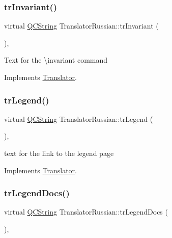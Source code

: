 \subsubsection{\texorpdfstring{trInvariant()}{trInvariant()}}
{\footnotesize\ttfamily virtual \mbox{\hyperlink{class_q_c_string}{Q\+C\+String}} Translator\+Russian\+::tr\+Invariant (\begin{DoxyParamCaption}{ }\end{DoxyParamCaption})\hspace{0.3cm}{\ttfamily [inline]}, {\ttfamily [virtual]}}

Text for the \textbackslash{}invariant command 

Implements \mbox{\hyperlink{class_translator}{Translator}}.

\mbox{\label{class_translator_russian_ad3e9670c7414a75075fe3bb8dcd7854e}} 
\subsubsection{\texorpdfstring{trLegend()}{trLegend()}}
{\footnotesize\ttfamily virtual \mbox{\hyperlink{class_q_c_string}{Q\+C\+String}} Translator\+Russian\+::tr\+Legend (\begin{DoxyParamCaption}{ }\end{DoxyParamCaption})\hspace{0.3cm}{\ttfamily [inline]}, {\ttfamily [virtual]}}

text for the link to the legend page 

Implements \mbox{\hyperlink{class_translator}{Translator}}.

\mbox{\label{class_translator_russian_a1ed299ff39b462fe2c71ea861ef8973d}} 
\subsubsection{\texorpdfstring{trLegendDocs()}{trLegendDocs()}}
{\footnotesize\ttfamily virtual \mbox{\hyperlink{class_q_c_string}{Q\+C\+String}} Translator\+Russian\+::tr\+Legend\+Docs (\begin{DoxyParamCaption}{ }\end{DoxyParamCaption})\hspace{0.3cm}{\ttfamily [inline]}, {\ttfamily [virtual]}}

